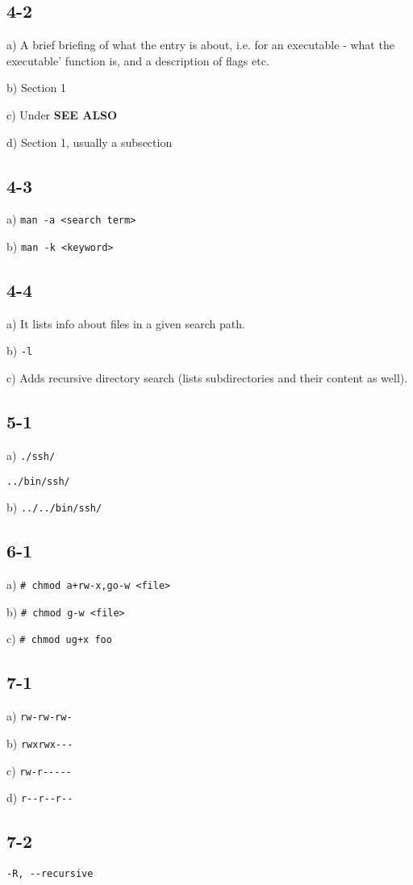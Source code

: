 \subsection{4-2}
a) A brief briefing of what the entry is about, i.e. for an executable - what the executable' function is,
   and a description of flags etc.

b) Section 1

c) Under \textbf{SEE ALSO}

d) Section 1, usually a subsection

\subsection{4-3}
a) \verb=man -a <search term>=

b) \verb=man -k <keyword>=

\subsection{4-4}
a) It lists info about files in a given search path.

b) \verb=-l=

c) Adds recursive directory search (lists subdirectories and their content as well).

\subsection{5-1}
a) \verb=./ssh/=

   \verb=../bin/ssh/ =

b) \verb=../../bin/ssh/=

\subsection{6-1}
a) \verb=# chmod a+rw-x,go-w <file>=

b) \verb=# chmod g-w <file>=

c) \verb=# chmod ug+x foo=

\subsection{7-1}
a) \verb=rw-rw-rw-=

b) \verb=rwxrwx---=

c) \verb=rw-r-----=

d) \verb=r--r--r--=

\subsection{7-2}
\verb=-R, --recursive=

